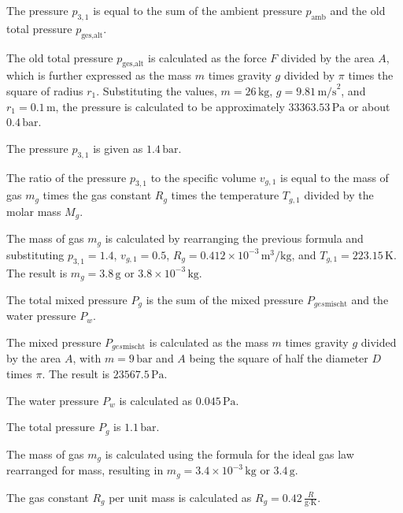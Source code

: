 The pressure \( p_{3,1} \) is equal to the sum of the ambient pressure \( p_{\text{amb}} \) and the old total pressure \( p_{\text{ges,alt}} \).

The old total pressure \( p_{\text{ges,alt}} \) is calculated as the force \( F \) divided by the area \( A \), which is further expressed as the mass \( m \) times gravity \( g \) divided by \( \pi \) times the square of radius \( r_1 \). Substituting the values, \( m = 26 \, \text{kg} \), \( g = 9.81 \, \text{m/s}^2 \), and \( r_1 = 0.1 \, \text{m} \), the pressure is calculated to be approximately \( 33363.53 \, \text{Pa} \) or about \( 0.4 \, \text{bar} \).

The pressure \( p_{3,1} \) is given as \( 1.4 \, \text{bar} \).

The ratio of the pressure \( p_{3,1} \) to the specific volume \( v_{g,1} \) is equal to the mass of gas \( m_g \) times the gas constant \( R_g \) times the temperature \( T_{g,1} \) divided by the molar mass \( M_g \).

The mass of gas \( m_g \) is calculated by rearranging the previous formula and substituting \( p_{3,1} = 1.4 \), \( v_{g,1} = 0.5 \), \( R_g = 0.412 \times 10^{-3} \, \text{m}^3/\text{kg} \), and \( T_{g,1} = 223.15 \, \text{K} \). The result is \( m_g = 3.8 \, \text{g} \) or \( 3.8 \times 10^{-3} \, \text{kg} \).

The total mixed pressure \( P_g \) is the sum of the mixed pressure \( P_{ges\text{mischt}} \) and the water pressure \( P_w \).

The mixed pressure \( P_{ges\text{mischt}} \) is calculated as the mass \( m \) times gravity \( g \) divided by the area \( A \), with \( m = 9 \, \text{bar} \) and \( A \) being the square of half the diameter \( D \) times \( \pi \). The result is \( 23567.5 \, \text{Pa} \).

The water pressure \( P_w \) is calculated as \( 0.045 \, \text{Pa} \).

The total pressure \( P_g \) is \( 1.1 \, \text{bar} \).

The mass of gas \( m_g \) is calculated using the formula for the ideal gas law rearranged for mass, resulting in \( m_g = 3.4 \times 10^{-3} \, \text{kg} \) or \( 3.4 \, \text{g} \).

The gas constant \( R_g \) per unit mass is calculated as \( R_g = 0.42 \, \frac{R}{\text{g} \cdot \text{K}} \).